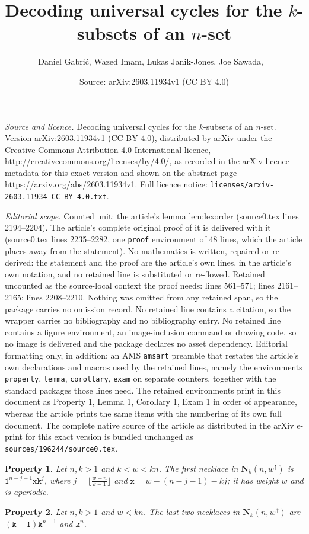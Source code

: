 \documentclass[10pt,a4paper]{amsart}
\title{Decoding universal cycles for the $k$-subsets of an $n$-set}
\author{Daniel Gabri\'{c}, Wazed Imam, Lukas Janik-Jones, Joe Sawada, ~}
\date{Source: arXiv:2603.11934v1 (CC BY 4.0)}
\newtheorem{property}{Property}
\newcommand{\bN}{\mathbf{N}}
\renewcommand{\tt} {\mathtt}
\begin{document}
\maketitle

\noindent\emph{Source and licence.} Decoding universal cycles for the $k$-subsets of an $n$-set. Version arXiv:2603.11934v1 (CC BY 4.0), distributed by arXiv under the Creative Commons Attribution 4.0 International licence, http://creativecommons.org/licenses/by/4.0/, as recorded in the arXiv licence metadata for this exact version and shown on the abstract page https://arxiv.org/abs/2603.11934v1. Full licence notice: \texttt{licenses/arxiv-2603.11934-CC-BY-4.0.txt}.\par\smallskip

\noindent\textit{Editorial scope.} Counted unit: the article's lemma lem:lexorder (source0.tex lines 2194--2204). The article's complete original proof of it is delivered with it (source0.tex lines 2235--2282, one \texttt{proof} environment of 48 lines, which the article places away from the statement). No mathematics is written, repaired or re-derived: the statement and the proof are the article's own lines, in the article's own notation, and no retained line is substituted or re-flowed.  Retained uncounted as the source-local context the proof needs: lines 561--571; lines 2161--2165; lines 2208--2210.  Nothing was omitted from any retained span, so the package carries no omission record.  No retained line contains a citation, so the wrapper carries no bibliography and no bibliography entry.  No retained line contains a figure environment, an image-inclusion command or drawing code, so no image is delivered and the package declares no asset dependency.  Editorial formatting only, in addition: an AMS \texttt{amsart} preamble that restates the article's own declarations and macros used by the retained lines, namely the environments \texttt{property}, \texttt{lemma}, \texttt{corollary}, \texttt{exam} on separate counters, together with the standard packages those lines need.  The retained environments print in this document as Property 1, Lemma 1, Corollary 1, Exam 1 in order of appearance, whereas the article prints the same items with the numbering of its own full document.  The complete native source of the article as distributed in the arXiv e-print for this exact version is bundled unchanged as \texttt{sources/196244/source0.tex}.
%
\begin{property} \label{prop:first}
Let $n,k > 1$ and $k < w < kn$.  The first necklace in $\bN_k(n,w^\uparrow)$ is $\tt{1}^{n-j-1}\tt{x}\tt{k}^{j}$,
where $j=\lfloor \frac{w-n}{k-1}\rfloor$ and $\tt{x} = w-(n{-}j{-}1)-kj$; it has weight $w$ and is aperiodic.
\end{property}
%
\begin{property} \label{prop:last}
 Let $n,k > 1$ and $w < kn$.  The last two necklaces in  $\bN_k(n,w^\uparrow)$ are
 $(\tt{k{-}1})\tt{k}^{n-1}$ and $\tt{k}^n$.
\end{property}
%
\end{document}
